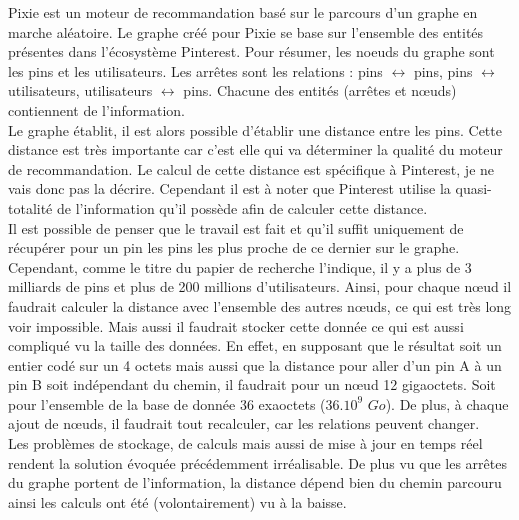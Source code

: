 \documentclass{article} %
\begin{document}
Pixie est un moteur de recommandation basé sur le parcours d'un graphe en marche aléatoire. Le graphe créé pour Pixie se base sur l'ensemble des entités présentes dans l'écosystème Pinterest. Pour résumer, les noeuds du graphe sont les pins et les utilisateurs. Les arrêtes sont les relations : pins $\leftrightarrow$ pins, pins $\leftrightarrow$ utilisateurs, utilisateurs $\leftrightarrow$ pins. Chacune des entités (arrêtes et nœuds) contiennent de l'information.\\
Le graphe établit, il est alors possible d'établir une distance entre les pins. Cette distance est très importante car c'est elle qui va déterminer la qualité du moteur de recommandation. Le calcul de cette distance est spécifique à Pinterest, je ne vais donc pas la décrire. Cependant il est à noter que Pinterest utilise la quasi-totalité de l'information qu'il possède afin de calculer cette distance.\\
Il est possible de penser que le travail est fait et qu'il suffit uniquement de récupérer pour un pin les pins les plus proche de ce dernier sur le graphe. Cependant, comme le titre du papier de recherche l'indique, il y a plus de 3 milliards de pins et plus de 200 millions d'utilisateurs. Ainsi, pour chaque nœud il faudrait calculer la distance avec l'ensemble des autres nœuds, ce qui est très long voir impossible. Mais aussi il faudrait stocker cette donnée ce qui est aussi compliqué vu la taille des données. En effet, en supposant que le résultat soit un entier codé sur un 4 octets mais aussi que la distance pour aller d'un pin A à un pin B soit indépendant du chemin, il faudrait pour un nœud 12 gigaoctets. Soit pour l'ensemble de la base de donnée 36 exaoctets ($36.10^9$ $Go$). De plus, à chaque ajout de nœuds, il faudrait tout recalculer, car les relations peuvent changer.\\
Les problèmes de stockage, de calculs mais aussi de mise à jour en temps réel rendent la solution évoquée précédemment irréalisable. De plus vu que les arrêtes du graphe portent de l'information, la distance dépend bien du chemin parcouru ainsi les calculs ont été (volontairement) vu à la baisse.\\
\end{document}
